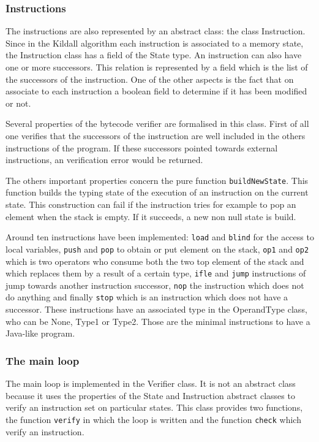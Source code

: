 \subsubsection{Instructions}
The instructions are also represented by an abstract class: 
the class Instruction.  
Since in the Kildall algorithm each instruction is associated to a memory state,  the Instruction class has a field of the State type. 
An instruction can also have one or more successors. 
This relation is represented by a field which is the list of the successors of the instruction.  
One of the other aspects is the fact that on associate to each instruction a boolean field to determine if it has been modified or not.

Several properties of the bytecode verifier are formalised in this class.
First of all one verifies that the successors of the instruction are well included in the others instructions of the program. 
If these successors pointed towards external instructions, an verification error would be returned. 

The others important properties concern the pure function {\tt buildNewState}.
This function builds the typing state of the execution of an instruction  on the current state.
This construction can fail if the instruction tries for example to pop an element when the stack is empty.
If it succeeds, a new non null state is build.

Around ten instructions have been implemented:  {\tt load} and {\tt blind} for the access to local variables, {\tt push} and {\tt pop}   to obtain or put element on the stack, {\tt op1} and {\tt op2} which is two operators who consume both the two top element of the stack and which replaces them by a result of a certain type, {\tt ifle} and {\tt jump} instructions of jump towards another instruction successor, {\tt nop}  the instruction which does not do anything   and finally {\tt stop} which is an instruction which does not have a successor.
These instructions have an associated type in the OperandType class,
who can be None, Type1 or Type2.  Those are the minimal instructions to have a Java-like program.  
\subsubsection {The main loop}
The main loop is implemented in the Verifier class.
It is not an abstract class because it uses the properties of the State and Instruction abstract classes  to verify an instruction set on particular states.
This class provides two functions, the function  {\tt verify} in which the loop is written and the function {\tt check} which verify an instruction.

